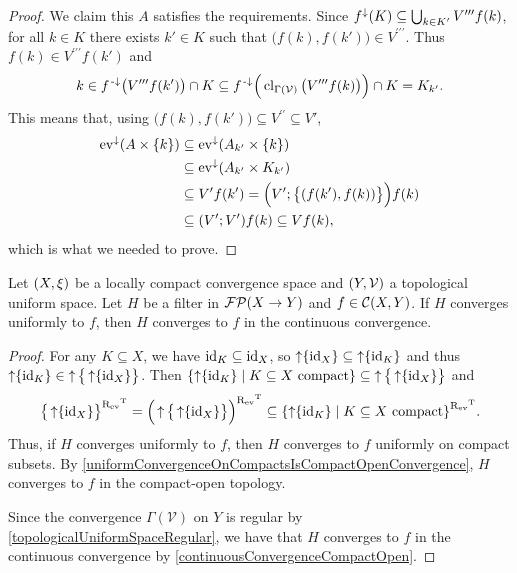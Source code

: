\begin{proof}
We claim this $A$ satisfies the requirements. Since $f^\downarrow(K)\subseteq \bigcup_{k\in K'}V^{\prime\prime\prime}f(k)$, for all $k\in K$ there exists $k'\in K$ such that $\big(f(k), f(k')\big)\in V^{\prime\prime\prime}$. Thus $f(k) \in V^{\prime\prime\prime}f(k')$ and
\[ k\in f^{\text{\hspace{0.15em}-}\downarrow}\big(V^{\prime\prime\prime}f(k')\big)\cap K \subseteq f^{\text{\hspace{0.15em}-}\downarrow}\Big(\operatorname{cl}_{\Gamma(\mathcal{V})}\big(V^{\prime\prime\prime}f(k)\big)\Big)\cap K = K_{k'}. \]
This means that, using $\big(f(k), f(k')\big)\subseteq V^{\prime\prime}\subseteq V'$,
\begin{align*}
\operatorname{ev}^\downarrow(A\times \{k\}) &\subseteq \operatorname{ev}^\downarrow(A_{k'}\times \{k\}) \\
&\subseteq \operatorname{ev}^\downarrow(A_{k'}\times K_{k'}) \\
&\subseteq V'f(k') = \Big(V';\big\{(f(k'), f(k))\big\}\Big)f(k) \\
&\subseteq (V';V')f(k) \subseteq Vf(k),
\end{align*}
which is what we needed to prove.
\end{proof}

\begin{proposition} \label{uniformImpliesContinuousConvergence}
Let $\sSet{X,\xi}$ be a locally compact convergence space and $\sSet{Y,\mathcal{V}}$ a topological uniform space. Let $H$ be a filter in $\operatorname{\mathcal{FP}}(X\to Y)$ and $f\in \operatorname{\mathcal{C}}(X, Y)$. If $H$ converges uniformly to $f$, then $H$ converges to $f$ in the continuous convergence.
\end{proposition}
\begin{proof}
For any $K\subseteq X$, we have $\operatorname{id}_K\subseteq \operatorname{id}_X$, so $\operatorname{\uparrow}\{\operatorname{id}_X\}\subseteq \operatorname{\uparrow}\{\operatorname{id}_K\}$ and thus $\operatorname{\uparrow}\{\operatorname{id}_K\}\in \operatorname{\uparrow} \big\{\operatorname{\uparrow}\{\operatorname{id}_X\}\big\}$. Then $\setbuilder{\upset\{\id_K\}}{\text{$K\subseteq X$ compact}} \subseteq \upset \big\{\upset\{\id_X\}\big\}$ and
\[ \big\{\upset\{\id_X\}\big\}^{\uRelEv^\transp} = \Big(\upset \big\{\upset\{\id_X\}\big\}\Big)^{\uRelEv^\transp} \subseteq \setbuilder{\upset\{\id_K\}}{\text{$K\subseteq X$ compact}}^{\uRelEv^\transp}. \]
Thus, if $H$ converges uniformly to $f$, then $H$ converges to $f$ uniformly on compact subsets. By \ref{uniformConvergenceOnCompactsIsCompactOpenConvergence}, $H$ converges to $f$ in the compact-open topology.

Since the convergence $\Gamma(\mathcal{V})$ on $Y$ is regular by \ref{topologicalUniformSpaceRegular}, we have that $H$ converges to $f$ in the continuous convergence by \ref{continuousConvergenceCompactOpen}.
\end{proof}

